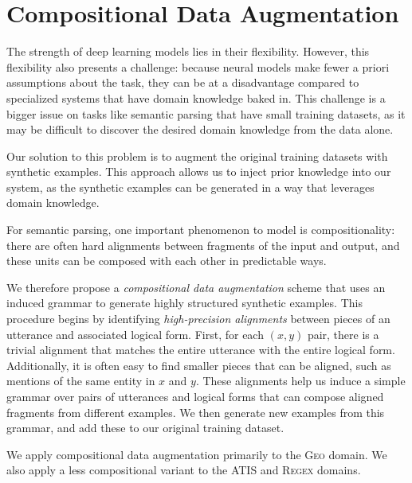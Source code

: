 \documentclass[11pt,letterpaper]{article}
\newcommand{\atis}{\textsc{ATIS}\xspace}
\newcommand{\regex}{\textsc{Regex}\xspace}
\newcommand{\geo}{\textsc{Geo}\xspace}
\newcommand\pl[1]{}
\newcommand\rj[1]{}
\begin{document}
\section{Compositional Data Augmentation}
The strength of deep learning models lies in their flexibility.
However, this flexibility also presents a challenge:
because neural models make fewer a priori assumptions about the task,
they can be at a disadvantage compared to specialized systems
that have domain knowledge baked in.
This challenge is a bigger issue on tasks like semantic parsing
that have small training datasets, as
it may be difficult to discover the desired domain knowledge
from the data alone.

Our solution to this problem is to
augment the original training datasets with synthetic examples.
This approach allows us to inject prior knowledge into our system,
as the synthetic examples can be generated 
in a way that leverages domain knowledge.

For semantic parsing, one important phenomenon to model is compositionality:
there are often hard alignments between fragments
of the input and output, and these units can be composed
with each other in predictable ways.
\pl{need an example / FIGURE illustrating compositionality - this is too abstract }
\rj{I'm optimistic that the geo augmentation figure is sufficient?}
We therefore propose a \emph{compositional data augmentation} scheme
that uses an induced grammar to generate highly structured synthetic examples.
This procedure begins by identifying \emph{high-precision alignments}
between pieces of an utterance and associated logical form.
First, for each $(x, y)$ pair, there is a trivial alignment that
matches the entire utterance with the entire logical form.
Additionally, it is often easy to find smaller pieces that can be aligned,
such as mentions of the same entity in $x$ and $y$.
These alignments help us
induce a simple grammar over pairs of utterances and logical forms
that can compose aligned fragments from different examples.
We then generate new examples from this grammar,
and add these to our original training dataset.

We apply compositional data augmentation primarily to the \geo domain.
We also apply a less compositional variant to the
\atis and \regex domains.
\end{document}
